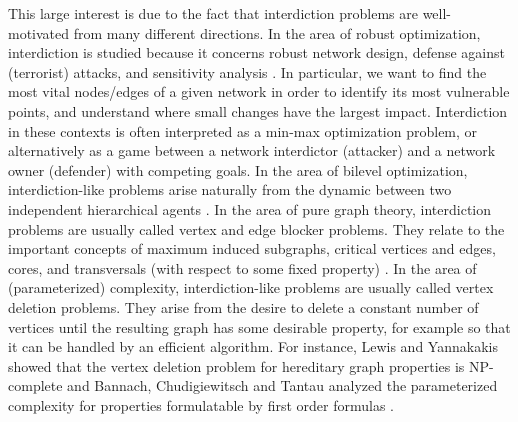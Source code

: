 This large interest is due to the fact that interdiction problems are well-motivated from many different directions. 
In the area of robust optimization, interdiction is studied because it concerns robust network design, defense against (terrorist) attacks, and sensitivity analysis \cite{DBLP:journals/corr/abs-2406-01756}. 
In particular, we want to find the most vital nodes/edges of a given network in order to identify its most vulnerable points, and understand where small changes have the largest impact. 
Interdiction in these contexts is often interpreted as a min-max optimization problem, or alternatively as a game between a network interdictor (attacker) and a network owner (defender) with competing goals.
In the area of bilevel optimization, interdiction-like problems arise naturally from the dynamic between two independent hierarchical agents \cite{DBLP:conf/ipco/CapraraCLW13}.
In the area of pure graph theory, interdiction problems are usually called vertex and edge blocker problems. 
They relate to the important concepts of maximum induced subgraphs, critical vertices and edges, cores, and transversals (with respect to some fixed property) \cite{DBLP:conf/tamc/PaulusmaPR17}.
In the area of (parameterized) complexity, interdiction-like problems are usually called vertex deletion problems.
They arise from the desire to delete a constant number of vertices until the resulting graph has some desirable property, for example so that it can be handled by an efficient algorithm.
For instance, Lewis and Yannakakis showed that the vertex deletion problem for hereditary graph properties is NP-complete \cite{DBLP:journals/jcss/LewisY80} and Bannach, Chudigiewitsch and Tantau analyzed the parameterized complexity for properties formulatable by first order formulas \cite{DBLP:conf/mfcs/BannachCT24}.


